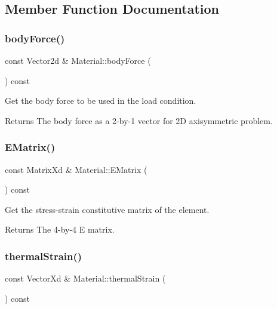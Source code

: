 \subsection{Member Function Documentation}
\mbox{\label{class_material_a5995e3b7d8063f670e33f2fcd7315928}} 
\subsubsection{\texorpdfstring{body\+Force()}{bodyForce()}}
{\footnotesize\ttfamily const Vector2d \& Material\+::body\+Force (\begin{DoxyParamCaption}{ }\end{DoxyParamCaption}) const}



Get the body force to be used in the load condition. 

\begin{DoxyReturn}{Returns}
The body force as a 2-\/by-\/1 vector for 2D axisymmetric problem. 
\end{DoxyReturn}
\mbox{\label{class_material_abaae85c04f84374421337e2bf140ec0a}} 
\subsubsection{\texorpdfstring{E\+Matrix()}{EMatrix()}}
{\footnotesize\ttfamily const Matrix\+Xd \& Material\+::\+E\+Matrix (\begin{DoxyParamCaption}{ }\end{DoxyParamCaption}) const}



Get the stress-\/strain constitutive matrix of the element. 

\begin{DoxyReturn}{Returns}
The 4-\/by-\/4 E matrix. 
\end{DoxyReturn}
\mbox{\label{class_material_ae84dc6468819487050db131b589ffb95}} 
\subsubsection{\texorpdfstring{thermal\+Strain()}{thermalStrain()}}
{\footnotesize\ttfamily const Vector\+Xd \& Material\+::thermal\+Strain (\begin{DoxyParamCaption}{ }\end{DoxyParamCaption}) const}



